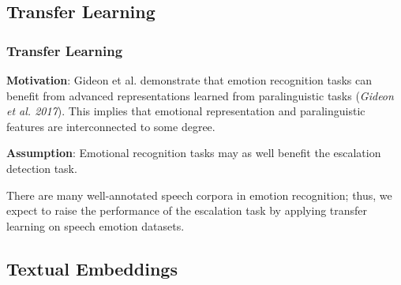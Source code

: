 \documentclass[
	11pt, %
]{beamer}
\begin{document}
\subsection{Transfer Learning}
\begin{frame}
	\frametitle{Transfer Learning}

	\textbf{Motivation}: Gideon et al. demonstrate that emotion recognition tasks can benefit from advanced representations learned from paralinguistic tasks (\emph{Gideon et al. 2017}). This implies that emotional representation and paralinguistic features are interconnected to some degree.
	
	\bigskip
	
	\textbf{Assumption}: Emotional recognition tasks may as well benefit the escalation detection task.
	
	\bigskip
	
	There are many well-annotated speech corpora in emotion recognition; thus, we expect to raise the performance of the escalation task by applying transfer learning on speech emotion datasets.
	
\end{frame}


\subsection{Textual Embeddings}
\end{document}
